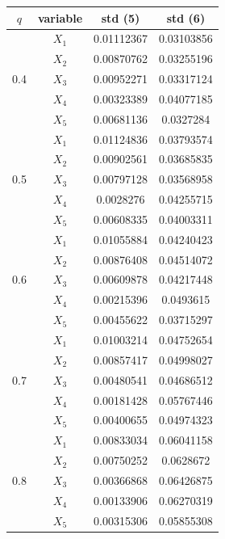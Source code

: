 \documentclass[paper=letter, fontsize=12pt]{article}
\begin{document}
\begin{enumerate}[label=(\alph*)]
\begin{enumerate}[label=(\roman*)]
		\begin{longtable}{|c|c|c|c|}
			\hline
			$q$ & variable & std (5) & std (6) \\ \hline
			\multirow{5}{1em}{0.4} & $X_1$ & 0.01112367 & 0.03103856 \\ 
			& $X_2$ & 0.00870762 & 0.03255196 \\
			& $X_3$ & 0.00952271 & 0.03317124 \\
			& $X_4$ & 0.00323389 & 0.04077185 \\
			& $X_5$ & 0.00681136 & 0.0327284 \\
			\hline
			\multirow{5}{1em}{0.5} & $X_1$ & 0.01124836 & 0.03793574 \\ 
			& $X_2$ & 0.00902561 & 0.03685835 \\
			& $X_3$ & 0.00797128 & 0.03568958 \\
			& $X_4$ & 0.0028276 & 0.04255715 \\
			& $X_5$ & 0.00608335 & 0.04003311 \\
			\hline
			\multirow{5}{1em}{0.6} & $X_1$ & 0.01055884 & 0.04240423 \\ 
			& $X_2$ & 0.00876408 & 0.04514072 \\
			& $X_3$ & 0.00609878 & 0.04217448 \\
			& $X_4$ & 0.00215396 & 0.0493615 \\
			& $X_5$ & 0.00455622 & 0.03715297 \\
			\hline
			\multirow{5}{1em}{0.7} & $X_1$ & 0.01003214 & 0.04752654 \\ 
			& $X_2$ & 0.00857417 & 0.04998027 \\
			& $X_3$ & 0.00480541 & 0.04686512 \\
			& $X_4$ & 0.00181428 & 0.05767446 \\
			& $X_5$ & 0.00400655 & 0.04974323 \\
			\hline
			\multirow{5}{1em}{0.8} & $X_1$ & 0.00833034 & 0.06041158 \\ 
			& $X_2$ & 0.00750252 & 0.0628672 \\
			& $X_3$ & 0.00366868 & 0.06426875 \\
			& $X_4$ & 0.00133906 & 0.06270319 \\
			& $X_5$ & 0.00315306 & 0.05855308 \\
			\hline
		\end{longtable}
	\end{enumerate}
\end{enumerate}
\end{document}
